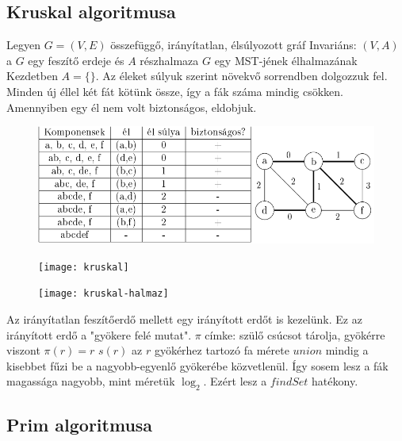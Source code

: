 \documentclass[12pt,a4paper]{article}
\begin{document}
\pagebreak

\subsection{Kruskal algoritmusa}

\begin{outline}
	\1 Legyen $G=(V,E)$ összefüggő, irányítatlan, élsúlyozott gráf
	\1 Invariáns: $(V,A)$ a $G$ egy feszítő erdeje és $A$ részhalmaza $G$ egy MST-jének élhalmazának
	\1 Kezdetben $A=\{\}$. Az éleket súlyuk szerint növekvő sorrendben dolgozzuk fel. Minden új éllel két fát kötünk össze, így a fák száma mindig csökken. Amennyiben egy él nem volt biztonságos, eldobjuk.
\end{outline}

\begin{figure}[h!]
	\centering
	\includegraphics[width=0.9\linewidth]{kruskal-példa}
\end{figure}

\begin{figure}[h!]
	\centering
	\texttt{[image: kruskal]}
\end{figure}

\pagebreak

\begin{figure}[h!]
	\centering
	\texttt{[image: kruskal-halmaz]}
\end{figure}

\begin{outline}
	\1 Az irányítatlan feszítőerdő mellett egy irányított erdőt is kezelünk. Ez az irányított erdő a "gyökere felé mutat".
	\1 $\pi$ címke: szülő csúcsot tárolja, gyökérre viszont $\pi(r)=r$
	\1 $s(r)$ az $r$ gyökérhez tartozó fa mérete
	\1 $union$ mindig a kisebbet fűzi be a nagyobb-egyenlő gyökerébe közvetlenül. Így sosem lesz a fák magassága nagyobb, mint méretük $\log_2$. Ezért lesz a $findSet$ hatékony.
\end{outline}

\pagebreak

\subsection{Prim algoritmusa}
\end{document}
